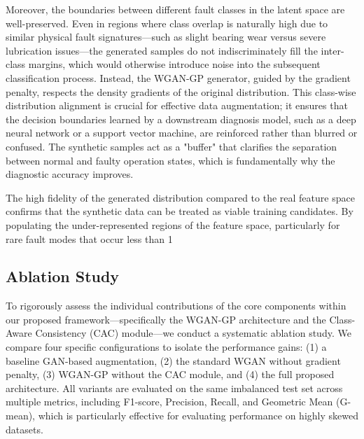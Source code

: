 \documentclass[twocolumn]{IEEEtran}
\begin{document}
Moreover, the boundaries between different fault classes in the latent space are well-preserved. Even in regions where class overlap is naturally high due to similar physical fault signatures—such as slight bearing wear versus severe lubrication issues—the generated samples do not indiscriminately fill the inter-class margins, which would otherwise introduce noise into the subsequent classification process. Instead, the WGAN-GP generator, guided by the gradient penalty, respects the density gradients of the original distribution. This class-wise distribution alignment is crucial for effective data augmentation; it ensures that the decision boundaries learned by a downstream diagnosis model, such as a deep neural network or a support vector machine, are reinforced rather than blurred or confused. The synthetic samples act as a "buffer" that clarifies the separation between normal and faulty operation states, which is fundamentally why the diagnostic accuracy improves.

The high fidelity of the generated distribution compared to the real feature space confirms that the synthetic data can be treated as viable training candidates. By populating the under-represented regions of the feature space, particularly for rare fault modes that occur less than 1%

\subsection{Ablation Study}
\label{subsec:ablation}

To rigorously assess the individual contributions of the core components within our proposed framework—specifically the WGAN-GP architecture and the Class-Aware Consistency (CAC) module—we conduct a systematic ablation study. We compare four specific configurations to isolate the performance gains: (1) a baseline GAN-based augmentation, (2) the standard WGAN without gradient penalty, (3) WGAN-GP without the CAC module, and (4) the full proposed architecture. All variants are evaluated on the same imbalanced test set across multiple metrics, including F1-score, Precision, Recall, and Geometric Mean (G-mean), which is particularly effective for evaluating performance on highly skewed datasets.
\end{document}
